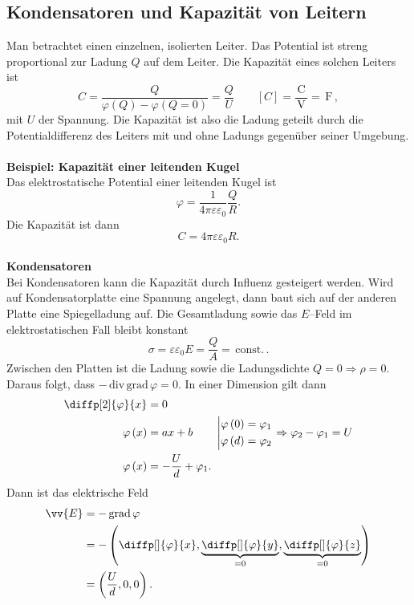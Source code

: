 \subsection{Kondensatoren und Kapazität von Leitern}
Man betrachtet einen einzelnen, isolierten Leiter. Das Potential ist streng proportional zur Ladung $Q$ auf dem Leiter. Die Kapazität eines solchen Leiters ist
\[ 
        C=\dfrac{Q}{\varphi \left(Q\right)-\varphi \left(Q=0\right)}=\dfrac{Q}{U}\qquad \left[C\right]=\dfrac{\,\text{C}\,}{\,\text{V}\,}=\,\text{F}\,
,\] 
mit $U$ der Spannung. Die Kapazität ist also die Ladung geteilt durch die Potentialdifferenz des Leiters mit und ohne Ladungs gegenüber seiner Umgebung.
\\\hfill\\\textbf{Beispiel: Kapazität einer leitenden Kugel}\\ 
Das elektrostatische Potential einer leitenden Kugel ist
\[ 
        \varphi =\dfrac{1}{4\pi \varepsilon \varepsilon _0}\dfrac{Q}{R}
.\] 
Die Kapazität ist dann
\[ 
        C=4\pi \varepsilon \varepsilon _0R
.\] 
\hfill\\\textbf{Kondensatoren}\\ 
Bei Kondensatoren kann die Kapazität durch Influenz gesteigert werden. Wird auf Kondensatorplatte eine Spannung angelegt, dann baut sich auf der anderen Platte eine Spiegelladung auf. Die Gesamtladung sowie das $E$--Feld im elektrostatischen Fall bleibt konstant
\[ 
        \sigma =\varepsilon \varepsilon _0E=\dfrac{Q}{A}=\,\text{const.}\,
.\] 
Zwischen den Platten ist die Ladung sowie die Ladungsdichte $Q=0\Rightarrow \rho =0$. Daraus folgt, dass $-\,\text{div}\,\text{grad}\,\varphi =0$. In einer Dimension gilt dann
\begin{align*}
        \diffp[2]{\varphi }{x}&=0\\
        \varphi \left(x\right)&=ax+b\qquad \left|\begin{aligned}
                \varphi \left(0\right)&=\varphi _1\\\varphi \left(d\right)&=\varphi _2
        \end{aligned}\right.\Rightarrow \varphi _2-\varphi _1=U\\
        \varphi \left(x\right)&=-\dfrac{U}{d}+\varphi _1
.\end{align*}
Dann ist das elektrische Feld
\begin{align*}
        \vv{E}&=-\,\text{grad}\,\varphi \\
              &=-\left(\diffp[]{\varphi }{x},\underbrace{\diffp[]{\varphi }{y}}_{=0},\underbrace{\diffp[]{\varphi }{z}}_{=0}\right)\\
              &=\left(\dfrac{U}{d},0,0\right)
.\end{align*}

